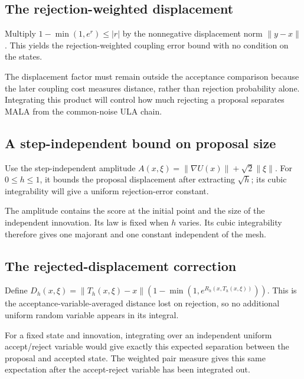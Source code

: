 \documentclass[11pt,a4paper]{article}
\begin{document}
\subsection{\texorpdfstring{The rejection-weighted displacement}{The rejection-weighted displacement}}


Multiply \(1-\min(1,e^r)\le|r|\) by the nonnegative displacement norm \(\|y-x\|\). This yields the rejection-weighted coupling error bound with no condition on the states.



The displacement factor must remain outside the acceptance comparison because the later coupling cost measures distance, rather than rejection probability alone. Integrating this product will control how much rejecting a proposal separates MALA from the common-noise ULA chain.


\subsection{\texorpdfstring{A step-independent bound on proposal size}{A step-independent bound on proposal size}}


Use the step-independent amplitude \(A(x,\xi)=\|\nabla U(x)\|+\sqrt2\|\xi\|\). For \(0\le h\le1\), it bounds the proposal displacement after extracting \(\sqrt h\); its cubic integrability will give a uniform rejection-error constant.



The amplitude contains the score at the initial point and the size of the independent innovation. Its law is fixed when \(h\) varies. Its cubic integrability therefore gives one majorant and one constant independent of the mesh.


\subsection{\texorpdfstring{The rejected-displacement correction}{The rejected-displacement correction}}


Define \(D_h(x,\xi)=\|T_h(x,\xi)-x\|(1-\min(1,e^{R_h(x,T_h(x,\xi))}))\). This is the acceptance-variable-averaged distance lost on rejection, so no additional uniform random variable appears in its integral.



For a fixed state and innovation, integrating over an independent uniform accept/\allowbreak{}reject variable would give exactly this expected separation between the proposal and accepted state. The weighted pair measure gives this same expectation after the accept-reject variable has been integrated out.
\end{document}
